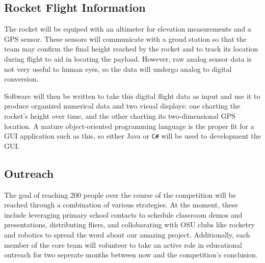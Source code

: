 \documentclass[onecolumn, draftclsnofoot,10pt, compsoc]{IEEEtran}
\begin{document}
\subsection{Rocket Flight Information}
The rocket will be equiped with an altimeter for elevation measurements and a GPS sensor. 
These sensors will communicate with a groud station so that the team may confirm the final height reached by the rocket and to track its location during flight to aid in locating the payload.
However, raw analog sensor data is not very useful to human eyes, so the data will undergo analog to digital conversion.
\par Software will then be written to take this digital flight data as input and use it to produce organized numerical data and two visual displays: one charting the rocket's height over time, and the other charting its two-dimensional GPS location. 
A mature object-oriented programming language is the proper fit for a GUI application such as this, so either Java or \verb!C#! will be used to development the GUI.
\subsection{Outreach}
The goal of reaching 200 people over the course of the competition will be reached through a combination of various strategies. 
At the moment, these include leveraging primary school contacts to schedule classroom demos and presentations, distributing fliers, and collobarating with OSU clubs like rocketry and robotics to spread the word about our amazing project.
Additionally, each member of the core team will volunteer to take an active role in educational outreach for two seperate months between now and the competition's conclusion.
\end{document}
